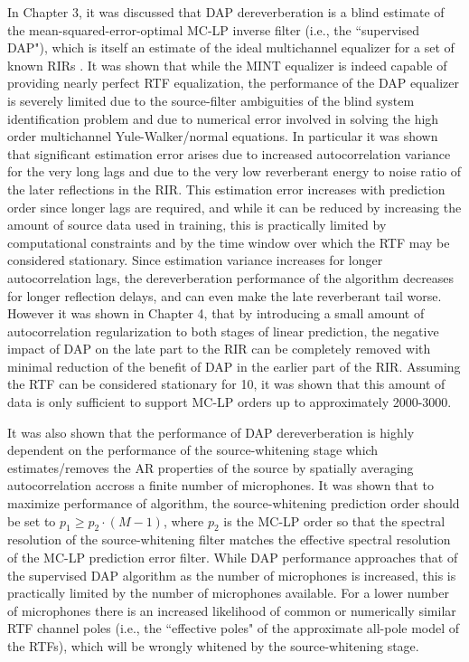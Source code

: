 In Chapter 3, it was discussed that DAP dereverberation is a blind estimate of the mean-squared-error-optimal MC-LP inverse filter (i.e., the ``supervised DAP"), which is itself an estimate of the ideal multichannel equalizer for a set of known RIRs \citep[i.e., the MINT equalizer][]{miyoshi1986inverse, miyoshi1988inverse}. It was shown that while the MINT equalizer is indeed capable of providing nearly perfect RTF equalization, the performance of the DAP equalizer is severely limited due to the source-filter ambiguities of the blind system identification problem and due to numerical error involved in solving the high order multichannel Yule-Walker/normal equations. In particular it was shown that significant estimation error arises due to increased autocorrelation variance for the very long lags and due to the very low reverberant energy to noise ratio of the later reflections in the RIR. This estimation error increases with prediction order since longer lags are required, and while it can be reduced by increasing the amount of source data used in training, this is practically limited by computational constraints and by the time window over which the RTF may be considered stationary. Since estimation variance  increases for longer autocorrelation lags, the dereverberation performance of the algorithm decreases for longer reflection delays, and can even make the late reverberant tail worse. However it was shown in Chapter 4, that by introducing a small amount of autocorrelation regularization to both stages of linear prediction, the negative impact of DAP on the late part to the RIR can be completely removed with minimal reduction of the benefit of DAP in the earlier part of the RIR. Assuming the RTF can be considered stationary for \qty{10}{\sec}, it was shown that this amount of data is only sufficient to support MC-LP orders up to approximately 2000-3000.

It was also shown that the performance of DAP dereverberation is highly dependent on the performance of the source-whitening stage which estimates/removes the AR properties of the source by spatially averaging autocorrelation accross a finite number of microphones. It was shown that to maximize performance of algorithm, the source-whitening prediction order should be set to $p_1 \geq p_2 \cdot (M-1)$, where $p_2$ is the MC-LP order so that the spectral resolution of the source-whitening filter matches the effective spectral resolution of the MC-LP prediction error filter. While DAP performance approaches that of the supervised DAP algorithm as the number of microphones is increased, this is practically limited by the number of microphones available. For a lower number of microphones there is an increased likelihood of common or numerically similar RTF channel poles (i.e., the ``effective poles" of the approximate all-pole model of the RTFs), which will be wrongly whitened by the source-whitening stage. 

